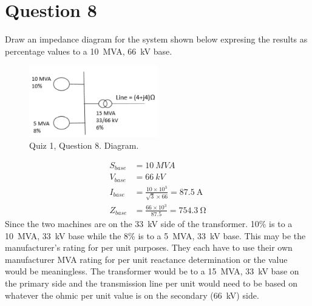 \section{Question 8}
Draw an impedance diagram for the system shown below expresing the results as percentage values to a \SI{10}{MVA}, \SI{66}{kV} base.
\begin{figure}[H]
    \centering
    \includegraphics[width = 0.5\textwidth]{img/figure148.png}
    \caption{Quiz 1, Question 8. Diagram.}
\end{figure}
\begin{align}
    S_{base} &= \SI{10}{MVA}\\
    V_{base} &= \SI{66}{kV}\\
    I_{base} &= \frac{10\times10^3}{\sqrt{3}\times 66} = \SI{87.5}{\ampere}\\
    Z_{base} &= \frac{66\times 10^3}{87.5} = \SI{754.3}{\ohm}
\end{align}
Since the two machines are on the \SI{33}{kV} side of the transformer. 10\% is to a \SI{10}{MVA}, \SI{33}{kV} base while the 8\% is to a \SI{5}{MVA}, \SI{33}{kV} base. This may be the manufacturer's rating for per unit purposes. They each have to use their own manufacturer MVA rating for per unit reactance determination or the value would be meaningless. The transformer would be to a \SI{15}{MVA}, \SI{33}{kV} base on the primary side and the transmission line per unit would need to be based on whatever the ohmic per unit value is on the secondary (\SI{66}{kV}) side.

